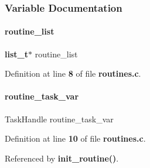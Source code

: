 \subsubsection{Variable Documentation}
\mbox{\label{a00140_a4d70ab7b0355718354a9678801101aa2}} 
\paragraph{routine\+\_\+list}
{\footnotesize\ttfamily \textbf{ list\+\_\+t}$\ast$ routine\+\_\+list\hspace{0.3cm}{\ttfamily [static]}}



Definition at line \textbf{ 8} of file \textbf{ routines.\+c}.

\mbox{\label{a00140_a8ac8c8354c257b390c000a5153f4fec6}} 
\paragraph{routine\+\_\+task\+\_\+var}
{\footnotesize\ttfamily Task\+Handle routine\+\_\+task\+\_\+var\hspace{0.3cm}{\ttfamily [static]}}



Definition at line \textbf{ 10} of file \textbf{ routines.\+c}.



Referenced by \textbf{ init\+\_\+routine()}.

